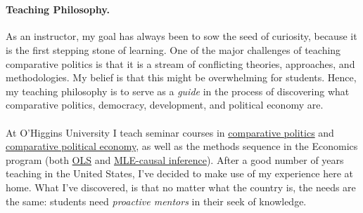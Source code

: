 \documentclass[letterpaper]{article}
\begin{document}



\vspace{-2cm}{\bf \huge Teaching Statement}\\

\paragraph{Teaching Philosophy.} As an instructor, my goal has always been to sow the seed of curiosity, because it is the first stepping stone of learning. One of the major challenges of teaching comparative politics is that it is a stream of conflicting theories, approaches, and methodologies. My belief is that this might be overwhelming for students. Hence, my teaching philosophy is to serve as a \emph{guide} in the process of discovering what comparative politics, democracy, development, and political economy are.

\paragraph{}At O'Higgins University I teach seminar courses in \href{https://github.com/hbahamonde/Ciencia_Politica_I/raw/master/Bahamonde_Ciencia_Politica_I.pdf}{comparative politics} and \href{https://github.com/hbahamonde/Ciencia_Politica_II/raw/master/Bahamonde_Ciencia_Politica_II.pdf}{comparative political economy}, as well as the methods sequence in the Economics program (both \href{https://github.com/hbahamonde/OLS/raw/master/Bahamonde_OLS.pdf}{OLS} and \href{https://github.com/hbahamonde/MLE/raw/master/Bahamonde_MLE.pdf}{MLE-causal inference}). After a good number of years teaching in the United States, I've decided to make use of my experience here at home. What I've discovered, is that no matter what the country is, the needs are the same: students need \emph{proactive mentors} in their seek of knowledge. 

\end{document}
